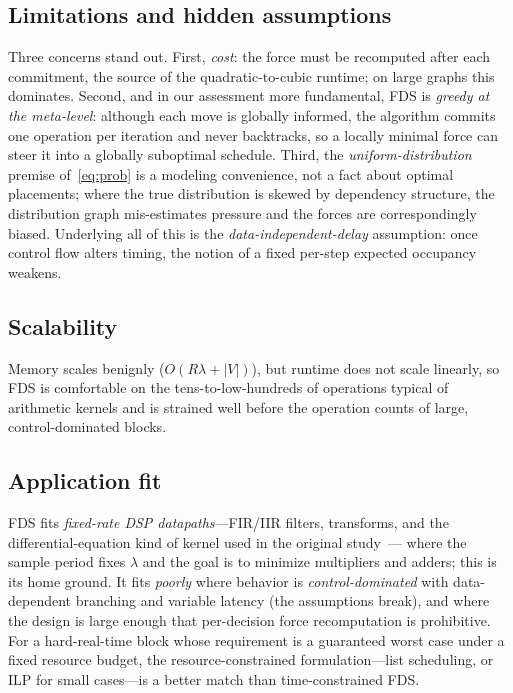 \documentclass[conference]{IEEEtran}
\begin{document}
\subsection{Limitations and hidden assumptions}
Three concerns stand out. First, \emph{cost}: the force must be recomputed
after each commitment, the source of the quadratic-to-cubic runtime; on large
graphs this dominates. Second, and in our assessment more fundamental, FDS is
\emph{greedy at the meta-level}: although each move is globally informed, the
algorithm commits one operation per iteration and never backtracks, so a
locally minimal force can steer it into a globally suboptimal schedule. Third,
the \emph{uniform-distribution} premise of~\eqref{eq:prob} is a modeling
convenience, not a fact about optimal placements; where the true distribution
is skewed by dependency structure, the distribution graph mis-estimates
pressure and the forces are correspondingly biased. Underlying all of this is
the \emph{data-independent-delay} assumption: once control flow alters timing,
the notion of a fixed per-step expected occupancy weakens.

\subsection{Scalability}
Memory scales benignly ($O(R\lambda+|V|)$), but runtime does not scale
linearly, so FDS is comfortable on the tens-to-low-hundreds of operations
typical of arithmetic kernels and is strained well before the operation counts
of large, control-dominated blocks.

\subsection{Application fit}
FDS fits \emph{fixed-rate DSP datapaths}---FIR/IIR filters, transforms, and the
differential-equation kind of kernel used in the original study~\cite{b1}---
where the sample period fixes $\lambda$ and the goal is to minimize multipliers
and adders; this is its home ground. It fits \emph{poorly} where behavior is
\emph{control-dominated} with data-dependent branching and variable latency
(the assumptions break), and where the design is large enough that per-decision
force recomputation is prohibitive. For a hard-real-time block whose
requirement is a guaranteed worst case under a fixed resource budget, the
resource-constrained formulation---list scheduling, or ILP for small
cases---is a better match than time-constrained FDS.
\end{document}
